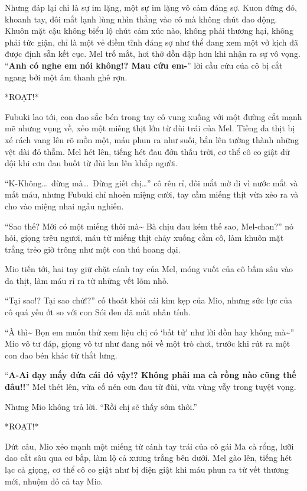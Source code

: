 \documentclass[../main.tex]{subfiles}
\begin{document}
Nhưng đáp lại chỉ là sự im lặng, một sự im lặng vô cảm đáng sợ. Kuon đứng đó, khoanh tay, đôi mắt lạnh lùng nhìn thẳng vào cô mà không chút dao động. Khuôn mặt cậu không biểu lộ chút cảm xúc nào, không phải thương hại, không phải tức giận, chỉ là một vẻ điềm tĩnh đáng sợ như thể đang xem một vở kịch đã được định sẵn kết cục. Mel trố mắt, hơi thở dồn dập hơn khi nhận ra sự vô vọng. ``\textbf{Anh có nghe em nói không!? Mau cứu em-}'' lời cầu cứu của cô bị cắt ngang bởi một âm thanh ghê rợn.

*ROẠT!*

Fubuki lao tới, con dao sắc bén trong tay cô vung xuống với một đường cắt mạnh mẽ nhưng vụng về, xẻo một miếng thịt lớn từ đùi trái của Mel. Tiếng da thịt bị xé rách vang lên rõ mồn một, máu phun ra như suối, bắn lên tường thành những vệt dài đỏ thẫm. Mel hét lên, tiếng hét đau đớn thấu trời, cơ thể cô co giật dữ dội khi cơn đau buốt từ đùi lan lên khắp người.

``K-Không\dots\ đừng mà\dots\ Đừng giết chị\dots'' cô rên rỉ, đôi mắt mờ đi vì nước mắt và mất máu, nhưng Fubuki chỉ nhoẻn miệng cười, tay cầm miếng thịt vừa xẻo ra và cho vào miệng nhai ngấu nghiến.

``Sao thế? Mới có một miếng thôi mà\~{} Bà chịu đau kém thế sao, Mel-chan?'' nó hỏi, giọng trêu ngươi, máu từ miếng thịt chảy xuống cằm cô, làm khuôn mặt trắng trẻo giờ trông như một con thú hoang dại.

Mio tiến tới, hai tay giữ chặt cánh tay của Mel, móng vuốt của cô bấm sâu vào da thịt, làm máu rỉ ra từ những vết lõm nhỏ.

``Tại sao!? Tại sao chứ!?'' cố thoát khỏi cái kìm kẹp của Mio, nhưng sức lực của cô quá yếu ớt so với con Sói đen đã mất nhân tính.

``À thì\~{} Bọn em muốn thử xem liệu chị có `bất tử' như lời đồn hay không mà\~{}'' Mio vô tư đáp, giọng vô tư như đang nói về một trò chơi, trước khi rút ra một con dao bén khác từ thắt lưng.

``\textbf{A-Ai dạy mấy đứa cái đó vậy!? Không phải ma cà rồng nào cũng thế đâu!!}'' Mel thét lên, vừa cố nén cơn đau từ đùi, vừa vùng vẫy trong tuyệt vọng.

Nhưng Mio không trả lời. ``Rồi chị sẽ thấy sớm thôi.''

*ROẠT!*

Dứt câu, Mio xẻo mạnh một miếng từ cánh tay trái của cô gái Ma cà rổng, lưỡi dao cắt sâu qua cơ bắp, làm lộ cả xương trắng bên dưới. Mel gào lên, tiếng hét lạc cả giọng, cơ thể cô co giật như bị điện giật khi máu phun ra từ vết thương mới, nhuộm đỏ cả tay Mio.
\end{document}
